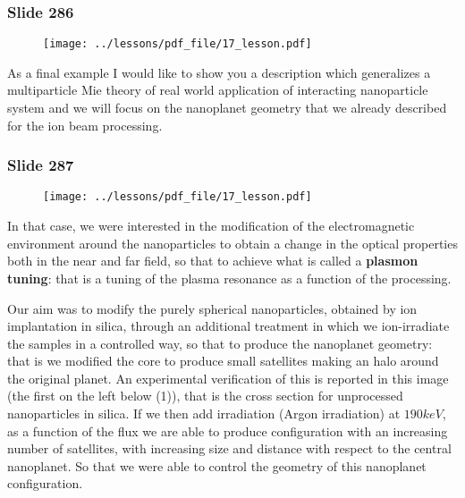 \documentclass[../main/main.tex]{subfiles}
\begin{document}
\newpage

\subsubsection{Slide 286}

\begin{figure}[h!]
\centering
\texttt{[image: ../lessons/pdf\_file/17\_lesson.pdf]}
\end{figure}

As a final example I would like to show you a description which generalizes a multiparticle Mie theory of real world application of interacting nanoparticle system and we will focus on the nanoplanet geometry that we already described for the ion beam processing.


\newpage

\subsubsection{Slide 287}

\begin{figure}[h!]
\centering
\texttt{[image: ../lessons/pdf\_file/17\_lesson.pdf]}
\end{figure}

In that case, we were interested in the modification of the electromagnetic environment around the nanoparticles to obtain a change in the optical properties both in the near and far field, so that to achieve what is called a \textbf{plasmon tuning}: that is a tuning of the plasma resonance as a function of the processing.

Our aim was to modify the purely spherical nanoparticles, obtained by ion implantation in silica, through an additional treatment in which we ion-irradiate the samples in a controlled way, so that to produce the nanoplanet geometry: that is we modified the core to produce small satellites making an halo around the original planet.
An experimental verification of this is reported in this image (the first on the left below (1)), that is the cross section for unprocessed nanoparticles in silica. If we then add irradiation (Argon irradiation) at $190 keV$, as a function of the flux we are able to produce configuration with an increasing number of satellites, with increasing size and distance with respect to the central nanoplanet. So that we were able to control the geometry of this nanoplanet configuration.

\newpage
\end{document}
